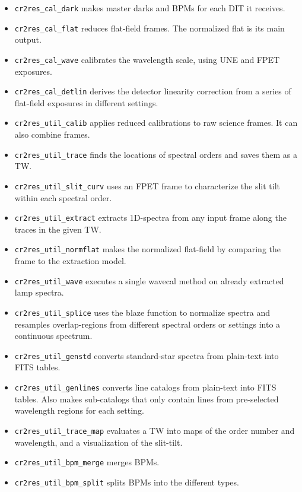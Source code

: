 \begin{itemize}
    \item \texttt{cr2res\_cal\_dark} makes master darks and BPMs for each DIT it
    receives.
    \item \texttt{cr2res\_cal\_flat} reduces flat-field frames. The normalized
    flat is its main output.
    \item \texttt{cr2res\_cal\_wave} calibrates the wavelength scale, using UNE
    and FPET exposures.
    \item \texttt{cr2res\_cal\_detlin} derives the detector linearity correction
    from a series of flat-field exposures in different settings.
    \item \texttt{cr2res\_util\_calib} applies reduced calibrations to raw
    science frames. It can also combine frames.
    \item \texttt{cr2res\_util\_trace} finds the locations of spectral orders
    and saves them as a TW.
    \item \texttt{cr2res\_util\_slit\_curv} uses an FPET frame to characterize
    the slit tilt within each spectral order.
    \item \texttt{cr2res\_util\_extract} extracts 1D-spectra from any input frame
    along the traces in the given TW.
    \item \texttt{cr2res\_util\_normflat} makes the normalized flat-field by
    comparing the frame to the extraction model.
    \item \texttt{cr2res\_util\_wave} executes a single wavecal method on
    already extracted lamp spectra.
    \item \texttt{cr2res\_util\_splice} uses the blaze function to normalize
    spectra and resamples overlap-regions from different spectral orders or
    settings into a continuous spectrum.
    \item \texttt{cr2res\_util\_genstd} converts standard-star spectra from
    plain-text into FITS tables.
    \item \texttt{cr2res\_util\_genlines} converts line catalogs from plain-text
    into FITS tables. Also makes sub-catalogs that only contain lines from
    pre-selected wavelength regions for each setting.
    \item \texttt{cr2res\_util\_trace\_map} evaluates a TW into maps of the
    order number and wavelength, and a visualization of the slit-tilt.
    \item \texttt{cr2res\_util\_bpm\_merge} merges BPMs.
    \item \texttt{cr2res\_util\_bpm\_split} splits BPMs into the different
    types.
\end{itemize}

